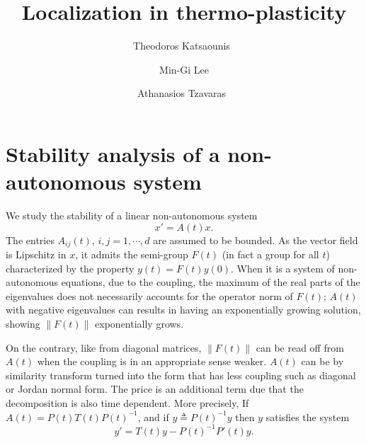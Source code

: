 \documentclass[a4paper,11pt]{article}
\theoremstyle{remark}
\begin{document}
\title{Localization in thermo-plasticity}
\author{Theodoros Katsaounis\footnotemark[1]\ \footnotemark[2]
\and Min-Gi Lee\footnotemark[1]
\and Athanasios Tzavaras\footnotemark[1]\  \footnotemark[2]  \footnotemark[3]}
\date{}

\maketitle
\renewcommand{\thefootnote}{\fnsymbol{footnote}}
\renewcommand{\thefootnote}{\arabic{footnote}}
\maketitle

%

\section{Stability analysis of a non-autonomous system}
We study the stability of a linear non-autonomous system
$$ x'=A(t) x.$$
The entries $A_{ij}(t)$, $i,j=1,\cdots,d$ are assumed to be bounded. As the vector field is Lipschitz in $x$, it admits the semi-group $F(t)$ (in fact a group for all $t$) characterized by the property $y(t)=F(t)y(0)$. When it is a system of non-autonomous equations, due to the coupling, the maximum of the real parts of the eigenvalues does not necessarily accounts for the operator norm of $F(t)$; $A(t)$ with negative eigenvalues can results in having an exponentially growing solution, showing $\|F(t)\|$ exponentially grows.

On the contrary, like from diagonal matrices, $\|F(t)\|$ can be read off from $A(t)$ when the coupling is in an appropriate sense weaker. $A(t)$ can be by similarity transform turned into the form that has less coupling such as diagonal or Jordan normal form. The price is an additional term due that the decomposition is also time dependent. More precisely, If $A(t) = P(t)T(t)P(t)^{-1}$, and if $y\triangleq P(t)^{-1}y$ then $y$ satisfies the system
$$ y' = T(t)y - P(t)^{-1}P'(t)y.$$
\end{document}
